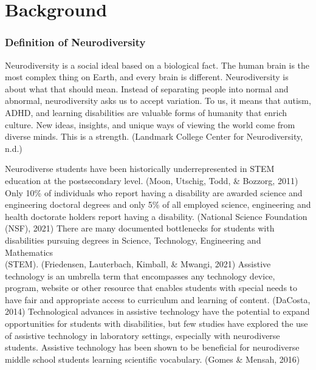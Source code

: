 \documentclass[11.5pt]{sig-alternate}
\begin{document}
\pagebreak
\pagebreak

\vspace{5mm}
\section*{\vspace{140mm}}
\section*{Background}
\subsubsection*{Definition of Neurodiversity}
\begin{large}
Neurodiversity is a social ideal based on a biological fact. The human brain is the most complex
thing on Earth, and every brain is different. Neurodiversity is about what that should mean. Instead of separating people into normal and abnormal, neurodiversity asks us to accept variation. To us, it means that autism, ADHD, and learning disabilities are valuable forms of humanity that enrich culture. New ideas, insights, and unique ways of viewing the world come from diverse minds. This is a strength. (Landmark College Center for Neurodiversity, n.d.)

Neurodiverse students have been historically underrepresented in STEM education at the postsecondary level. (Moon, Utschig, Todd, \& Bozzorg, 2011)  Only 10\% of individuals who report having a disability are awarded science and engineering doctoral degrees and only 5\% of all employed science, engineering and health doctorate holders report having a disability. (National Science Foundation (NSF), 2021)  There are many documented bottlenecks for students with disabilities pursuing degrees in Science, Technology, Engineering and Mathematics \\(STEM). (Friedensen, Lauterbach, Kimball, \& Mwangi, 2021) Assistive technology is an umbrella term that encompasses any technology device, program, website or other resource that enables students with special needs to have fair and appropriate access to curriculum and learning of content. (DaCosta, 2014)    Technological advances in assistive technology have the potential to expand opportunities for students with disabilities, but few studies have explored the use of assistive technology in laboratory settings, especially with neurodiverse students.  Assistive technology has been shown to be beneficial for neurodiverse middle school students learning scientific vocabulary. (Gomes \& Mensah, 2016)


\end{large}
\end{document}
